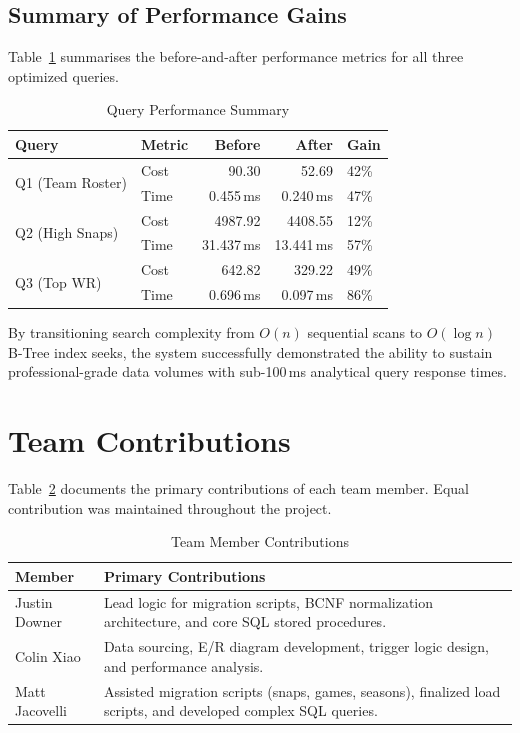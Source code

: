 \documentclass[conference]{IEEEtran}
\begin{document}
\subsection{Summary of Performance Gains}

Table~\ref{tab:perf} summarises the before-and-after performance metrics for all three optimized queries.

\begin{table}[h]
\centering
\caption{Query Performance Summary}
\label{tab:perf}
\begin{tabular}{llrrl}
\toprule
\textbf{Query} & \textbf{Metric} & \textbf{Before} & \textbf{After} & \textbf{Gain} \\
\midrule
\multirow{2}{*}{Q1 (Team Roster)}
  & Cost  & 90.30 & 52.69 & 42\% \\
  & Time  & 0.455\,ms & 0.240\,ms & 47\% \\
\midrule
\multirow{2}{*}{Q2 (High Snaps)}
  & Cost  & 4987.92 & 4408.55 & 12\% \\
  & Time  & 31.437\,ms & 13.441\,ms & 57\% \\
\midrule
\multirow{2}{*}{Q3 (Top WR)}
  & Cost  & 642.82 & 329.22 & 49\% \\
  & Time  & 0.696\,ms & 0.097\,ms & 86\% \\
\bottomrule
\end{tabular}
\end{table}

By transitioning search complexity from $O(n)$ sequential scans to $O(\log n)$ B-Tree index seeks, the system successfully demonstrated the ability to sustain professional-grade data volumes with sub-100\,ms analytical query response times.

\section{Team Contributions}

Table~\ref{tab:contrib} documents the primary contributions of each team member. Equal contribution was maintained throughout the project.

\begin{table}[h]
\centering
\caption{Team Member Contributions}
\label{tab:contrib}
\begin{tabularx}{\columnwidth}{lX}
\toprule
\textbf{Member} & \textbf{Primary Contributions} \\
\midrule
Justin Downer & Lead logic for migration scripts, BCNF normalization architecture, and core SQL stored procedures. \\
\midrule
Colin Xiao & Data sourcing, E/R diagram development, trigger logic design, and performance analysis. \\
\midrule
Matt Jacovelli & Assisted migration scripts (snaps, games, seasons), finalized load scripts, and developed complex SQL queries. \\
\bottomrule
\end{tabularx}
\end{table}
\end{document}
